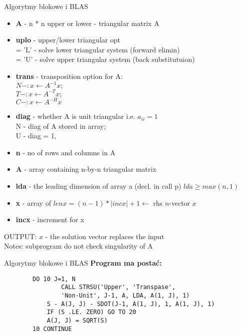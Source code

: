 	\begin{frame}[allowframebreaks]{Algorytmy blokowe i BLAS}
	\begin{itemize}
	\item \textbf{A} - n * n upper or lower - triangular matrix A \\
	\item \textbf{uplo} - upper/lower triangular opt \\
	= 'L' - solve lower triangular system (forward elimin) \\
	= 'U' - solve upper triangular system (back substitutuion) \\
	\item \textbf{trans} - transposition option for A: \\
	$N - : x \leftarrow A^{-1} x;$ \\
	$T - : x \leftarrow A^{-T} x;$ \\
	$C - : x \leftarrow A^{-H} x$ \\
	\item \textbf{diag} - whether A is unit triangular i.e. $a_{ii} = 1$ \\
	N - diag of A stored in array; \\
	U - diag = 1, \\
	\item \textbf{n} - no of rows and columns in A \\
	\item \textbf{A} - array containing n-by-n triangular matrix \\
	\item \textbf{lda} - the leading dimension of array a (decl. in call p) $lda \geq max(n, 1)$ \\ 
	\item \textbf{x} - array of $lenx = (n - 1) *  |incx| + 1 \leftarrow$ rhs $n$-vector $x$ \\
	\item \textbf{incx} - increment for x \\ 
	\end{itemize}
	OUTPUT:  $x$ - the solution vector replaces the input \\
	Notes: subprogram do not check singularity of A \\
	\end{frame}
	\begin{frame}[fragile]{Algorytmy blokowe i BLAS}
		\textbf{Program ma postać:}
		\begin{lstlisting}
		DO 10 J=1, N
				CALL STRSU('Upper', 'Transpase', 
				'Non-Unit', J-1, A, LDA, A(1, J), 1)
			S - A(J, J) - SDOT(J-1, A(1, J), 1, A(1, J), 1)
			IF (S .LE. ZERO) GO TO 20
			A(J, J) = SQRT(S)
		10 CONTINUE
		\end{lstlisting}
		
	\end{frame}
